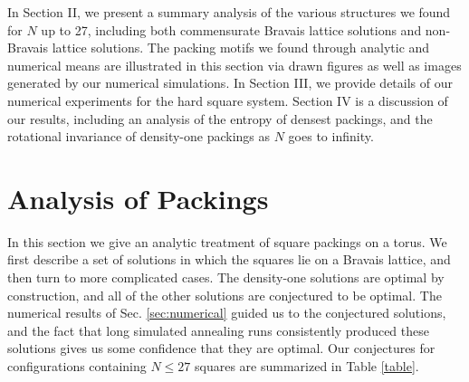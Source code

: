 \documentclass[aps]{revtex4}
\begin{document}
In Section II, we present a summary analysis of the various structures we found for $N$ up to 27, including both commensurate Bravais lattice solutions and non-Bravais lattice solutions.  The packing motifs we found through analytic and numerical means are illustrated in this section via drawn figures as well as images generated by our numerical simulations. In Section III, we provide details of our numerical experiments for the hard square system. Section IV is a discussion of our results, including an analysis of the entropy of densest packings, and the rotational invariance of density-one packings as $N$ goes to infinity. 

\section{Analysis of Packings}
\label{sec:analytics}

In this section we give an analytic treatment of square packings on a torus.  We first describe a set of solutions in which the squares lie on a Bravais lattice, and then turn to more complicated cases. The density-one solutions are optimal by construction, and all of the other solutions are conjectured to be optimal. The numerical results of Sec. \ref{sec:numerical} guided us to the conjectured solutions, and the fact that long simulated annealing runs consistently produced these solutions gives us some confidence that they are optimal.  Our conjectures for configurations containing $N \leq 27$ squares are summarized in Table \ref{table}.
\end{document}
